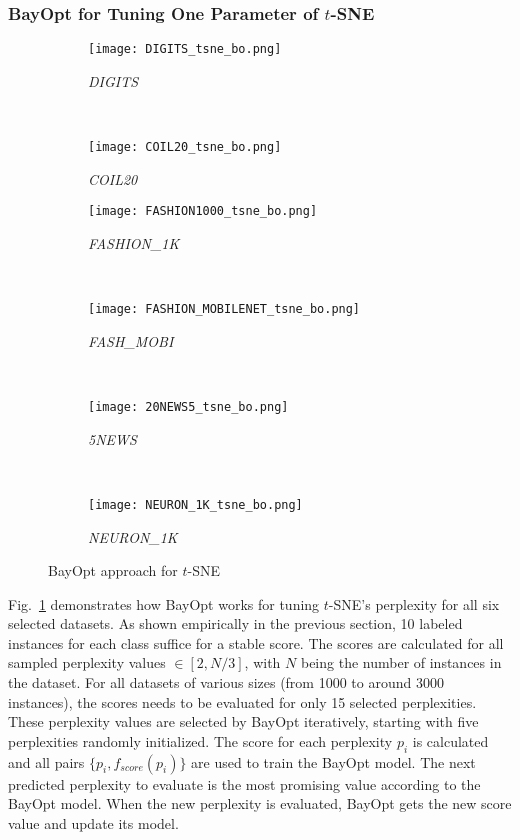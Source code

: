\subsubsection{BayOpt for Tuning One Parameter of $t$-SNE}\label{sec:result:bo:tsne}

\begin{figure}%
    \begin{subfigure}[b]{.46\linewidth}
        \centering
        \texttt{[image: DIGITS\_tsne\_bo.png]}
        \caption{\emph{DIGITS}}
    \end{subfigure}
    ~
    \begin{subfigure}[b]{.46\linewidth}
        \centering
        \texttt{[image: COIL20\_tsne\_bo.png]}
        \caption{\emph{COIL20}}
    \end{subfigure}
    \vfill
    \begin{subfigure}[b]{.46\linewidth}
        \centering
        \texttt{[image: FASHION1000\_tsne\_bo.png]}
        \caption{\emph{FASHION\_1K}}
    \end{subfigure}
    ~
    \begin{subfigure}[b]{.46\linewidth}
        \centering
        \texttt{[image: FASHION\_MOBILENET\_tsne\_bo.png]}
        \caption{\emph{FASH\_MOBI}}
    \end{subfigure}
    ~
    \vfill
    \begin{subfigure}[b]{.46\linewidth}
        \centering
        \texttt{[image: 20NEWS5\_tsne\_bo.png]}
        \caption{\emph{5NEWS}}
    \end{subfigure}
    ~
    \begin{subfigure}[b]{.46\linewidth}
        \centering
        \texttt{[image: NEURON\_1K\_tsne\_bo.png]}
        \caption{\emph{NEURON\_1K}}
    \end{subfigure}
    \caption{BayOpt approach for  $t$-SNE}
    \label{fig:tsne:bo:all}
\end{figure}

Fig.~\ref{fig:tsne:bo:all} demonstrates how BayOpt works for tuning $t$-SNE's perplexity for all six selected datasets.
As shown empirically in the previous section, 10 labeled instances for each class suffice for a stable score.
The scores are calculated for all sampled perplexity values $\in [2, N/3]$, with $N$ being the number of instances in the dataset.
For all datasets of various sizes (from 1000 to around 3000 instances), the scores needs to be evaluated for only 15 selected perplexities.
These perplexity values are selected by BayOpt iteratively, starting with five perplexities randomly initialized.
The score for each perplexity $p_i$ is calculated and all pairs $\{p_i, f_{score}(p_i)\}$ are used to train the BayOpt model.
The next predicted perplexity to evaluate is the most promising value according to the BayOpt model.
When the new perplexity is evaluated, BayOpt gets the new score value and update its model.


